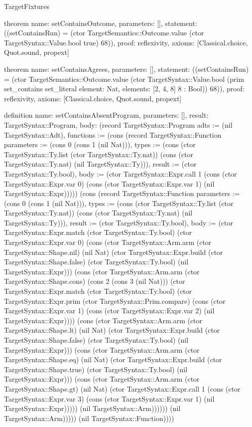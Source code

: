 \begin{lexlean}{TargetFixtures}
\begin{semanticmodule}
theorem{
  name: setContainsOutcome,
  parameters: [],
  statement: ((setContainsRun) = (ctor TargetSemantics::Outcome.value (ctor TargetSyntax::Value.bool true) 68)),
  proof: reflexivity{},
  axioms: [Classical.choice, Quot.sound, propext]
}

theorem{
  name: setContainsAgrees,
  parameters: [],
  statement: ((setContainsRun) = (ctor TargetSemantics::Outcome.value (ctor TargetSyntax::Value.bool (prim set_contains set_literal{
    element: Nat,
    elements: [2, 4, 8]
  } 8 : Bool)) 68)),
  proof: reflexivity{},
  axioms: [Classical.choice, Quot.sound, propext]
}

definition{
  name: setContainsAbsentProgram,
  parameters: [],
  result: TargetSyntax::Program,
  body: (record TargetSyntax::Program {adts := (nil TargetSyntax::Adt), functions := (cons (record TargetSyntax::Function {parameters := (cons 0 (cons 1 (nil Nat))), types := (cons (ctor TargetSyntax::Ty.list (ctor TargetSyntax::Ty.nat)) (cons (ctor TargetSyntax::Ty.nat) (nil TargetSyntax::Ty))), result := (ctor TargetSyntax::Ty.bool), body := (ctor TargetSyntax::Expr.call 1 (cons (ctor TargetSyntax::Expr.var 0) (cons (ctor TargetSyntax::Expr.var 1) (nil TargetSyntax::Expr))))}) (cons (record TargetSyntax::Function {parameters := (cons 0 (cons 1 (nil Nat))), types := (cons (ctor TargetSyntax::Ty.list (ctor TargetSyntax::Ty.nat)) (cons (ctor TargetSyntax::Ty.nat) (nil TargetSyntax::Ty))), result := (ctor TargetSyntax::Ty.bool), body := (ctor TargetSyntax::Expr.match (ctor TargetSyntax::Ty.bool) (ctor TargetSyntax::Expr.var 0) (cons (ctor TargetSyntax::Arm.arm (ctor TargetSyntax::Shape.nil) (nil Nat) (ctor TargetSyntax::Expr.build (ctor TargetSyntax::Shape.false) (ctor TargetSyntax::Ty.bool) (nil TargetSyntax::Expr))) (cons (ctor TargetSyntax::Arm.arm (ctor TargetSyntax::Shape.cons) (cons 2 (cons 3 (nil Nat))) (ctor TargetSyntax::Expr.match (ctor TargetSyntax::Ty.bool) (ctor TargetSyntax::Expr.prim (ctor TargetSyntax::Prim.compare) (cons (ctor TargetSyntax::Expr.var 1) (cons (ctor TargetSyntax::Expr.var 2) (nil TargetSyntax::Expr)))) (cons (ctor TargetSyntax::Arm.arm (ctor TargetSyntax::Shape.lt) (nil Nat) (ctor TargetSyntax::Expr.build (ctor TargetSyntax::Shape.false) (ctor TargetSyntax::Ty.bool) (nil TargetSyntax::Expr))) (cons (ctor TargetSyntax::Arm.arm (ctor TargetSyntax::Shape.eq) (nil Nat) (ctor TargetSyntax::Expr.build (ctor TargetSyntax::Shape.true) (ctor TargetSyntax::Ty.bool) (nil TargetSyntax::Expr))) (cons (ctor TargetSyntax::Arm.arm (ctor TargetSyntax::Shape.gt) (nil Nat) (ctor TargetSyntax::Expr.call 1 (cons (ctor TargetSyntax::Expr.var 3) (cons (ctor TargetSyntax::Expr.var 1) (nil TargetSyntax::Expr))))) (nil TargetSyntax::Arm)))))) (nil TargetSyntax::Arm))))}) (nil TargetSyntax::Function)))})
}


\end{semanticmodule}
\end{lexlean}
